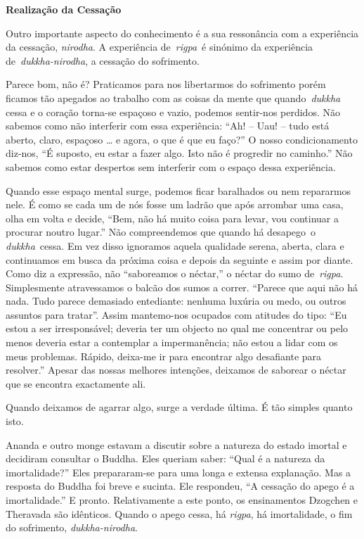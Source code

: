 \textbf{Realização da Cessação}

Outro importante aspecto do conhecimento é a sua ressonância com a
experiência da cessação, \emph{nirodha}. A experiência de~\emph{rigpa}~é
sinónimo da experiência de~\emph{dukkha-nirodha}, a cessação do
sofrimento.

Parece bom, não é? Praticamos para nos libertarmos do sofrimento porém
ficamos tão apegados ao trabalho com as coisas da mente que
quando~\emph{dukkha} cessa e o coração torna-se espaçoso e vazio,
podemos sentir-nos perdidos. Não sabemos como não interferir com essa
experiência: ``Ah! -- Uau! -- tudo está aberto, claro, espaçoso \ldots{}
e agora, o que é que eu faço?'' O nosso condicionamento diz-nos, ``É
suposto, eu estar a fazer algo. Isto não é progredir no caminho.'' Não
sabemos como estar despertos sem interferir com o espaço dessa
experiência.

Quando esse espaço mental surge, podemos ficar baralhados ou nem
repararmos nele. É como se cada um de nós fosse um ladrão que após
arrombar uma casa, olha em volta e decide, ``Bem, não há muito coisa
para levar, vou continuar a procurar noutro lugar.'' Não compreendemos
que quando há desapego~o \emph{dukkha}~cessa. Em vez disso ignoramos
aquela qualidade serena, aberta, clara e continuamos em busca da próxima
coisa e depois da seguinte e assim por diante. Como diz a expressão, não
``saboreamos o néctar,'' o néctar do sumo de~\emph{rigpa}. Simplesmente
atravessamos o balcão dos sumos a correr. ``Parece que aqui não há nada.
Tudo parece demasiado entediante: nenhuma luxúria ou medo, ou outros
assuntos para tratar''. Assim mantemo-nos ocupados com atitudes do tipo:
``Eu estou a ser irresponsável; deveria ter um objecto no qual me
concentrar ou pelo menos deveria estar a contemplar a impermanência; não
estou a lidar com os meus problemas. Rápido, deixa-me ir para encontrar
algo desafiante para resolver.'' Apesar das nossas melhores intenções,
deixamos de saborear o néctar que se encontra exactamente ali.

Quando deixamos de agarrar algo, surge a verdade última. É tão simples
quanto isto.

Ananda e outro monge estavam a discutir sobre a natureza do estado
imortal e decidiram consultar o Buddha. Eles queriam saber: ``Qual é a
natureza da imortalidade?'' Eles prepararam-se para uma longa e extensa
explanação. Mas a resposta do Buddha foi breve e sucinta. Ele respondeu,
``A cessação do apego é a imortalidade.'' E pronto. Relativamente a este
ponto, os ensinamentos Dzogchen e Theravada são idênticos. Quando o
apego cessa, há \emph{rigpa}, há imortalidade, o fim do sofrimento,
\emph{dukkha-nirodha}.


